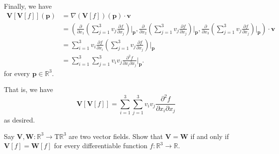 \documentclass[12 pt, letterpaper]{hmcpset}
\begin{document}
\begin{solution}
	Finally, we have
	\[
		\begin{split}
			\mathbf V[\mathbf V[f]](\mathbf p) & = \nabla(\mathbf V[f])(\mathbf p) \cdot \mathbf v \\
			& = \left ( \frac{\partial}{\partial x_1} \left ( \sum_{j = 1}^3 v_j \frac{\partial f}{\partial x_j} \right ) \Big |_{\mathbf p}, \frac{\partial}{\partial x_2} \left ( \sum_{j = 1}^3 v_j \frac{\partial f}{\partial x_j} \right ) \Big |_{\mathbf p}, \frac{\partial}{\partial x_3} \left ( \sum_{j = 1}^3 v_j \frac{\partial f}{\partial x_j} \right ) \Big |_{\mathbf p} \right ) \cdot \mathbf v \\
			& = \sum_{i = 1}^3 v_i \frac{\partial f}{\partial x_i} \left ( \sum_{j = 1}^3 v_j \frac{\partial f}{\partial x_j} \right ) \Big |_{\mathbf p} \\
			& = \sum_{i = 1}^3 \sum_{j = 1}^3 v_i v_j \frac{\partial^2 f}{\partial x_i \partial x_j} \Big |_{\mathbf p}.
		\end{split}
	\]
	for every $\mathbf p \in \mathbb R^3$. 

	That is, we have 
	\[
		\mathbf V[\mathbf V[f]] = \sum_{i = 1}^3 \sum_{j = 1}^3 v_i v_j \frac{\partial^2 f}{\partial x_i \partial x_j}
	\]
	as desired.
\end{solution}

\pagebreak

\begin{problem}[Problem 5.]
	Say $\mathbf V, \mathbf W : \mathbb R^3 \to \mathrm T \mathbb R^3$ are two vector fields. Show that $\mathbf V = \mathbf W$ if and only if $\mathbf V[f] = \mathbf W[f]$ for every differentiable function $f : \mathbb R^3 \to \mathbb R$.
\end{problem}
\end{document}
